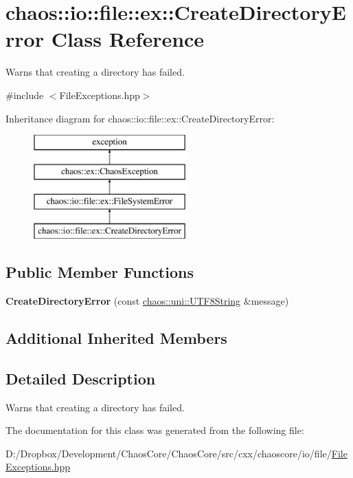\hypertarget{classchaos_1_1io_1_1file_1_1ex_1_1_create_directory_error}{}\section{chaos\+:\+:io\+:\+:file\+:\+:ex\+:\+:Create\+Directory\+Error Class Reference}
\label{classchaos_1_1io_1_1file_1_1ex_1_1_create_directory_error}


Warns that creating a directory has failed.  




{\ttfamily \#include $<$File\+Exceptions.\+hpp$>$}

Inheritance diagram for chaos\+:\+:io\+:\+:file\+:\+:ex\+:\+:Create\+Directory\+Error\+:\begin{figure}[H]
\begin{center}
\leavevmode
\includegraphics[height=4.000000cm]{classchaos_1_1io_1_1file_1_1ex_1_1_create_directory_error}
\end{center}
\end{figure}
\subsection*{Public Member Functions}
\begin{DoxyCompactItemize}
\item 
\hypertarget{classchaos_1_1io_1_1file_1_1ex_1_1_create_directory_error_a6b468970fd3f8b6f786e0b41becdc019}{}{\bfseries Create\+Directory\+Error} (const \hyperlink{classchaos_1_1uni_1_1_u_t_f8_string}{chaos\+::uni\+::\+U\+T\+F8\+String} \&message)\label{classchaos_1_1io_1_1file_1_1ex_1_1_create_directory_error_a6b468970fd3f8b6f786e0b41becdc019}

\end{DoxyCompactItemize}
\subsection*{Additional Inherited Members}


\subsection{Detailed Description}
Warns that creating a directory has failed. 

The documentation for this class was generated from the following file\+:\begin{DoxyCompactItemize}
\item 
D\+:/\+Dropbox/\+Development/\+Chaos\+Core/\+Chaos\+Core/src/cxx/chaoscore/io/file/\hyperlink{_file_exceptions_8hpp}{File\+Exceptions.\+hpp}\end{DoxyCompactItemize}
